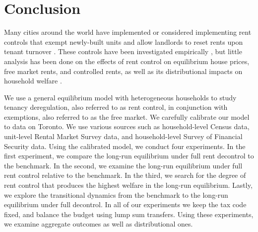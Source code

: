 \documentclass[parskip=full]{article}
\begin{document}
\section{Conclusion}\label{sec:conclusion}

Many cities around the world have implemented or considered implementing rent controls that exempt newly-built units and allow landlords to reset rents upon tenant turnover \citep{fraser-1981}. These controls have been investigated empirically \citep{hayek-1929,fs-1946,fallis-1985,diamond-2019}, but little analysis has been done on the effects of rent control on equilibrium house prices, free market rents, and controlled rents, as well as its distributional impacts on household welfare \citep{fmn-2022}. 

We use a general equilibrium model with heterogeneous households to study tenancy deregulation, also referred to as rent control, in conjunction with exemptions, also referred to as the free market. We carefully calibrate our model to data on Toronto. We use various sources such as household-level Census data, unit-level Rental Market Survey data, and household-level Survey of Financial Security data. Using the calibrated model, we conduct four experiments. In the first experiment, we compare the long-run equilibrium under full rent decontrol to the benchmark. In the second, we examine the long-run equilibrium under full rent control relative to the benchmark. In the third, we search for the degree of rent control that produces the highest welfare in the long-run equilibrium. Lastly, we explore the transitional dynamics from the benchmark to the long-run equilibrium under full decontrol. In all of our experiments we keep the tax code fixed, and balance the budget using lump sum transfers. Using these experiments, we examine aggregate outcomes as well as distributional ones.
\end{document}
